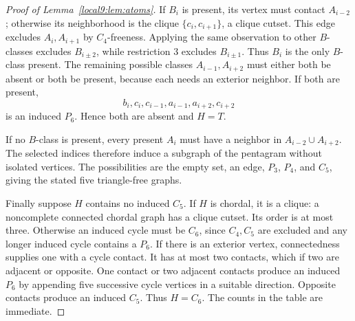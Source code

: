 \documentclass[11pt,a4paper]{article}
\theoremstyle{definition}\newtheorem{definition}[theorem]{Definition}
\theoremstyle{remark}\newtheorem{remark}[theorem]{Remark}
\begin{document}
\begin{proof}[Proof of Lemma~\ref{local9:lem:atoms}]
If $B_i$ is present, its vertex must contact $A_{i-2}$; otherwise its
neighborhood is the clique $\{c_i,c_{i+1}\}$, a clique cutset. This edge
excludes $A_i,A_{i+1}$ by $C_4$-freeness. Applying the same observation to
other $B$-classes excludes $B_{i\pm2}$, while restriction 3 excludes
$B_{i\pm1}$. Thus $B_i$ is the only $B$-class present. The remaining
possible classes $A_{i-1},A_{i+2}$ must either both be absent or both be
present, because each needs an exterior neighbor. If both are present,
\[
 b_i,c_i,c_{i-1},a_{i-1},a_{i+2},c_{i+2}
\]
is an induced $P_6$. Hence both are absent and $H=T$.

If no $B$-class is present, every present $A_i$ must have a neighbor in
$A_{i-2}\cup A_{i+2}$. The selected indices therefore induce a subgraph
of the pentagram without isolated vertices. The possibilities are the
empty set, an edge, $P_3$, $P_4$, and $C_5$, giving the stated five
triangle-free graphs.

Finally suppose $H$ contains no induced $C_5$. If $H$ is chordal, it is a
clique: a noncomplete connected chordal graph has a clique cutset. Its
order is at most three. Otherwise an induced cycle must be $C_6$, since
$C_4,C_5$ are excluded and any longer induced cycle contains a $P_6$.
If there is an exterior vertex, connectedness supplies one with a cycle
contact. It has at most two contacts, which if two are adjacent or
opposite. One contact or two adjacent contacts produce an induced $P_6$
by appending five successive cycle vertices in a suitable direction.
Opposite contacts produce an induced $C_5$. Thus $H=C_6$. The counts in
the table are immediate.
\end{proof}
\end{document}
